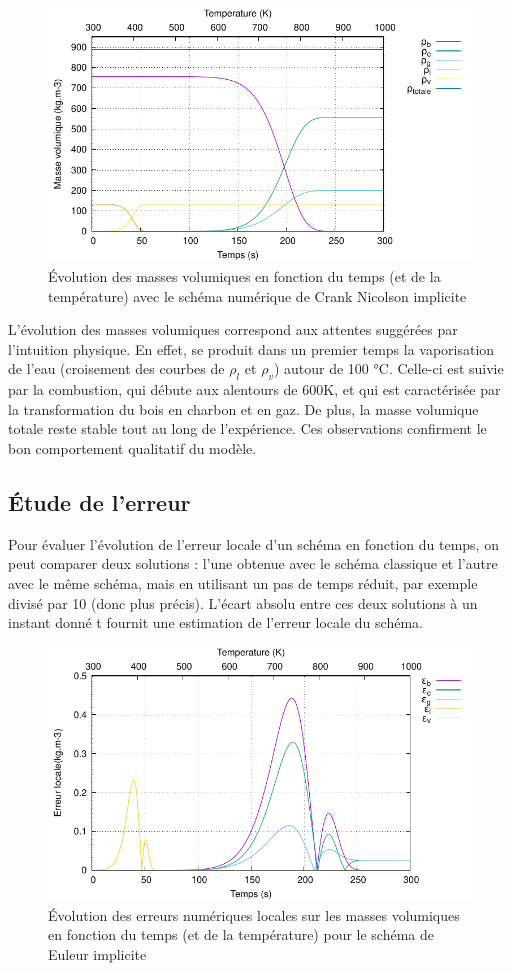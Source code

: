 \documentclass[a4paper,11pt]{article}
\begin{document}
\begin{figure}[H]
    \centering
    \includegraphics[width=0.8\linewidth]{images/densite_CK2.pdf}
    \caption{Évolution des masses volumiques en fonction du temps (et de la température) avec le schéma numérique de Crank Nicolson implicite }
    \label{fig:densiteCK2}
\end{figure}

L'évolution des masses volumiques correspond aux attentes suggérées par l'intuition physique. En effet, se produit dans un premier temps la vaporisation de l'eau (croisement des courbes de $\rho_l$ et $\rho_v$) autour de 100 °C. Celle-ci est suivie par la combustion, qui débute aux alentours de 600K, et qui est caractérisée par la transformation du bois en charbon et en gaz. De plus, la masse volumique totale reste stable tout au long de l'expérience. Ces observations confirment le bon comportement qualitatif du modèle.

\subsection{Étude de l'erreur}

Pour évaluer l'évolution de l'erreur locale d'un schéma en fonction du temps, on peut comparer deux solutions : l'une obtenue avec le schéma classique et l'autre avec le même schéma, mais en utilisant un pas de temps réduit, par exemple divisé par 10 (donc plus précis). L'écart absolu entre ces deux solutions à un instant donné t fournit une estimation de l'erreur locale du schéma.

\begin{figure}[H]
    \centering
    \includegraphics[width=0.75\linewidth]{images/error_EI.pdf}
    \caption{\centering \footnotesize Évolution des erreurs numériques locales sur les masses volumiques en fonction du temps (et de la température) pour le schéma de Euleur implicite }
    \label{fig:erEI}
\end{figure}
\end{document}
